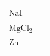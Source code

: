 \begin{enumerate}[noitemsep, label=\textbf{\arabic*}. ]
{\begin{center}
\begin{xtabular*}{\mytablewidth}[t]{|p{10\mystarwidth}|p{10\mystarwidth}|}
    
     \tabularnewline{}
    
    
        \begin{math}\mathrm{NaI}\end{math} &
    
    
     \tabularnewline{}
    
    
        \begin{math}\mathrm{MgCl}{}_{2}\end{math} &
    
    
     \tabularnewline{}
    
    
        \begin{math}\mathrm{Zn}\end{math} &
    
    

\end{xtabular*}
\end{center}}
\end{enumerate}

